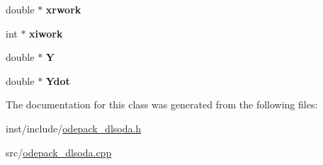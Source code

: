 \begin{DoxyCompactItemize}
\mbox{\label{classodepack__dlsoda_a824cd623c15909783611cfc319ddbfb9}} 
double $\ast$ {\bfseries xrwork}
\item 
\mbox{\label{classodepack__dlsoda_a111f730fd182cc30acea9327f5c224a1}} 
int $\ast$ {\bfseries xiwork}
\item 
\mbox{\label{classodepack__dlsoda_a6dce361fe841a8a9f3d5d1400889627e}} 
double $\ast$ {\bfseries Y}
\item 
\mbox{\label{classodepack__dlsoda_a3681231289f4223f080b460eb4cce7fc}} 
double $\ast$ {\bfseries Ydot}
\end{DoxyCompactItemize}


The documentation for this class was generated from the following files\+:\begin{DoxyCompactItemize}
\item 
inst/include/\hyperlink{odepack__dlsoda_8h}{odepack\+\_\+dlsoda.\+h}\item 
src/\hyperlink{odepack__dlsoda_8cpp}{odepack\+\_\+dlsoda.\+cpp}\end{DoxyCompactItemize}
